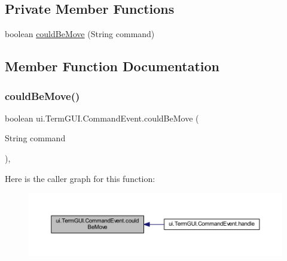 \subsection*{Private Member Functions}
\begin{DoxyCompactItemize}
\item 
boolean \mbox{\hyperlink{classui_1_1_term_g_u_i_1_1_command_event_af43c4e1f3ac3dcb978eb3009c4b0e407}{could\+Be\+Move}} (String command)
\end{DoxyCompactItemize}


\subsection{Member Function Documentation}
\mbox{\label{classui_1_1_term_g_u_i_1_1_command_event_af43c4e1f3ac3dcb978eb3009c4b0e407}} 
\subsubsection{\texorpdfstring{could\+Be\+Move()}{couldBeMove()}}
{\footnotesize\ttfamily boolean ui.\+Term\+G\+U\+I.\+Command\+Event.\+could\+Be\+Move (\begin{DoxyParamCaption}\item[{String}]{command }\end{DoxyParamCaption})\hspace{0.3cm}{\ttfamily [inline]}, {\ttfamily [private]}}

Here is the caller graph for this function\+:
\nopagebreak
\begin{figure}[H]
\begin{center}
\leavevmode
\includegraphics[width=350pt]{classui_1_1_term_g_u_i_1_1_command_event_af43c4e1f3ac3dcb978eb3009c4b0e407_icgraph}
\end{center}
\end{figure}
\mbox{\label{classui_1_1_term_g_u_i_1_1_command_event_a318fdfbc0c417b4a990a34b275e3896e}} 

